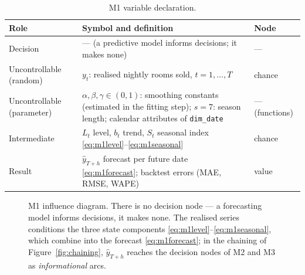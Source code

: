 \begin{table}[H]
\centering
\caption{M1 variable declaration.}
\label{tab:m1vars}
\begin{tabularx}{0.92\textwidth}{@{}l X l@{}}
\toprule
\textbf{Role} & \textbf{Symbol and definition} & \textbf{Node} \\
\midrule
Decision & --- (a predictive model informs decisions; it makes none) & --- \\
Uncontrollable (random) & $y_t$: realised nightly rooms sold, $t = 1,\ldots,T$ & chance \\
Uncontrollable (parameter) & $\alpha, \beta, \gamma \in (0,1)$: smoothing constants (estimated in the fitting step); $s = 7$: season length; calendar attributes of \texttt{dim\_date} & --- (functions) \\
Intermediate & $L_t$ level, $b_t$ trend, $S_t$ seasonal index \eqref{eq:m1level}--\eqref{eq:m1seasonal} & chance \\
Result & $\hat{y}_{T+h}$ forecast per future date \eqref{eq:m1forecast}; backtest errors (MAE, RMSE, WAPE) & value \\
\bottomrule
\end{tabularx}
\end{table}

\begin{figure}[H]
\centering
{}
\caption{M1 influence diagram. There is no decision node --- a forecasting model informs decisions, it makes none. The realised series conditions the three state components \eqref{eq:m1level}--\eqref{eq:m1seasonal}, which combine into the forecast \eqref{eq:m1forecast}; in the chaining of Figure~\ref{fig:chaining}, $\hat{y}_{T+h}$ reaches the decision nodes of M2 and M3 as \emph{informational} arcs.}
\label{fig:id-m1}
\end{figure}

